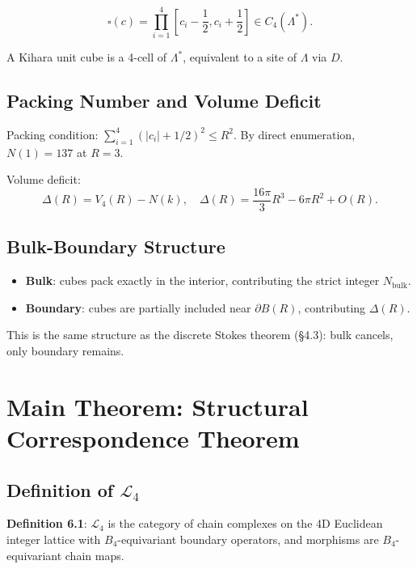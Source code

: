 \documentclass[a4paper,11pt]{article}
\begin{document}
\begin{equation}
\square(c) = \prod_{i=1}^{4} \left[c_i - \frac{1}{2}, c_i + \frac{1}{2}\right] \in C_4(\Lambda^*). \tag{5.1}
\end{equation}

A Kihara unit cube is a 4-cell of $\Lambda^*$, equivalent to a site of $\Lambda$ via $D$.

\subsection{Packing Number and Volume Deficit}

Packing condition: $\sum_{i=1}^{4} (|c_i| + 1/2)^2 \le R^2$. By direct enumeration, $N(1) = 137$ at $R=3$.

Volume deficit:
\begin{equation}
\Delta(R) = V_4(R) - N(k), \quad \Delta(R) = \frac{16\pi}{3} R^3 - 6\pi R^2 + O(R). \tag{5.2}
\end{equation}

\subsection{Bulk-Boundary Structure}

\begin{itemize}
\item \textbf{Bulk}: cubes pack exactly in the interior, contributing the strict integer $N_{\text{bulk}}$.
\item \textbf{Boundary}: cubes are partially included near $\partial B(R)$, contributing $\Delta(R)$.
\end{itemize}

This is the same structure as the discrete Stokes theorem (§4.3): bulk cancels, only boundary remains.

\section{Main Theorem: Structural Correspondence Theorem}

\subsection{Definition of $\mathcal{L}_4$}

\textbf{Definition 6.1}: $\mathcal{L}_4$ is the category of chain complexes on the 4D Euclidean integer lattice with $B_4$-equivariant boundary operators, and morphisms are $B_4$-equivariant chain maps.
\end{document}
